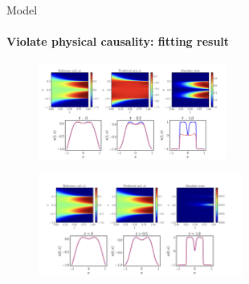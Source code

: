 \begin{frame}{Model}
\framesubtitle{Violate physical causality: fitting result}
    \begin{figure}[H]
        \centering
        \includegraphics[width=0.55\textwidth]{img/Screenshot 2024-06-02 at 5.03.05 PM}
    \end{figure} 
    \begin{figure}[H]
        \centering
        \includegraphics[width=0.6\textwidth]{img/Screenshot 2024-06-02 at 5.03.17 PM}
    \end{figure} 
\end{frame}